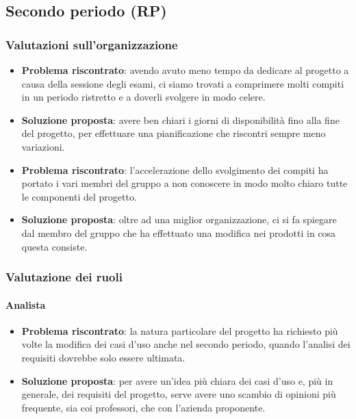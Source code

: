     \subsection{Secondo periodo (RP)}\label{valutazioni per il miglioramento:RP}
    
    \subsubsection{Valutazioni sull'organizzazione}
        \begin{itemize}
            \item \textbf{Problema riscontrato}: avendo avuto meno tempo da dedicare al progetto a causa della sessione degli esami, ci siamo trovati a comprimere molti compiti in un periodo ristretto e a doverli svolgere in modo celere.
            \item \textbf{Soluzione proposta}: avere ben chiari i giorni di disponibilità fino alla fine del progetto, per effettuare una pianificazione che riscontri sempre meno variazioni.
            \item \textbf{Problema riscontrato}: l'accelerazione dello svolgimento dei compiti ha portato i vari membri del gruppo a non conoscere in modo molto chiaro tutte le componenti del progetto.
            \item \textbf{Soluzione proposta}: oltre ad una miglior organizzazione, ci si fa spiegare dal membro del gruppo che ha effettuato una modifica nei prodotti in cosa questa consiste.
        \end{itemize}
    
    \subsubsection{Valutazione dei ruoli}
        
        \paragraph{Analista}
            \begin{itemize}
                \item \textbf{Problema riscontrato}: la natura particolare del progetto ha richiesto più volte la modifica dei casi d'uso anche nel secondo periodo, quando l'analisi dei requisiti dovrebbe solo essere ultimata.
                \item \textbf{Soluzione proposta}: per avere un'idea più chiara dei casi d'uso e, più in generale, dei requisiti del progetto, serve avere uno scambio di opinioni più frequente, sia coi professori, che con l'azienda proponente.
            \end{itemize}
        
